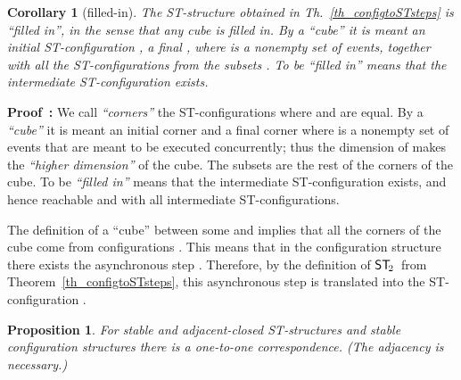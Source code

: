 \documentclass[submission,copyright,creativecommons]{eptcs}
\newtheorem{proposition}[theorem]{Proposition}
\newtheorem{corollary}[theorem]{Corollary}
\newenvironment{proof}[1][\!\!\,]{\vspace{1ex}\noindent\textbf{Proof #1: }}{\hfill\vspace{2ex}}
\newcommand{\cp}[1]{}
\newcommand\cintostSecond{\ensuremath{\mathsf{ST}_{\hspace{-0.4ex}2}}}
\begin{document}
\begin{corollary}[filled-in]\label{cor_cubicalProp_configST}
The ST-structure obtained in Th.~\ref{th_configtoSTsteps} is \emph{``filled in''}, in the sense that any cube is filled in. 
By a \textit{``cube''} it is meant an initial ST-configuration , a final , where  is a nonempty set of events, together with all the ST-configurations  from the subsets . 
To be \textit{``filled in''} means that the intermediate ST-configuration  exists.
\end{corollary}

\begin{proof}
We call \textit{``corners''} the ST-configurations where  and  are equal. 
By a \textit{``cube''} it is meant an initial corner  and a final corner  where  is a nonempty set of events that are meant to be executed concurrently; thus the dimension of  makes the \textit{``higher dimension''} of the cube. The subsets  are the rest of the corners of the cube. 
To be \textit{``filled in''} means that the intermediate ST-configuration  exists, and hence reachable and with all intermediate ST-configurations.


The definition of a ``cube'' between some  and  implies that all the corners of the cube come from configurations . This means that in the configuration structure there exists the asynchronous step . Therefore, by the definition of \cintostSecond\ from Theorem~\ref{th_configtoSTsteps}, this asynchronous step is translated into the ST-configuration .
\end{proof}

\begin{proposition}\label{prop_stableSTconf}
For stable and adjacent-closed ST-structures and stable configuration structures there is a one-to-one correspondence. (The adjacency is necessary.)
\end{proposition}

\cp{This result could be proven also as a result of equivalence of categories!? Moreover, the proof below makes heavy use of the condition of ST-structures; does the proof go through with the weaker constraint?}
\end{document}
